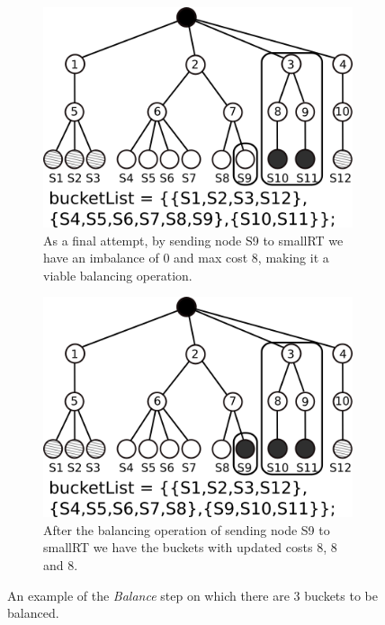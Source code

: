 \begin{figure}[t!]
	 \begin{subfigure}[t]{0.3\textwidth}
			 \centering
			 \includegraphics[width=\textwidth]{img/balance5}
			 \caption{As a final attempt, by sending node S9 to smallRT we have an imbalance of 0 and max cost 8, making it a viable balancing operation.}
			 \label{fig:balance5}
	 \end{subfigure}
	 \hspace{1mm}
	 \begin{subfigure}[t]{0.3\textwidth}
			 \centering
			 \includegraphics[width=\textwidth]{img/balance6}
			 \caption{After the balancing operation of sending node S9 to smallRT we have the buckets with updated costs 8, 8 and 8.}
			 \label{fig:balance6}
	 \end{subfigure}
	 \caption{An example of the {\em Balance} step on which there are 3 buckets to be balanced.}
	 \label{fig:balance}
\end{figure}

